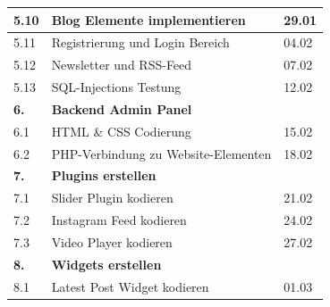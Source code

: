 \begin{table}[h]
\begin{center}
\begin{tabular}{ |l|l|l| }
\hline
5.10 & Blog Elemente implementieren & 29.01 \\
\hline
5.11 & Registrierung und Login Bereich & 04.02 \\
\hline
5.12 & Newsletter und RSS-Feed & 07.02 \\
\hline
5.13 & SQL-Injections Testung & 12.02 \\
\hline
 \textbf{6.} & \textbf{Backend Admin Panel} &  \\ 
 \hline
 6.1 & HTML \& CSS Codierung & 15.02 \\
 \hline
 6.2 & PHP-Verbindung zu Website-Elementen & 18.02 \\
 \hline
 \textbf{7.} & \textbf{Plugins erstellen} &  \\ 
 \hline
 7.1 & Slider Plugin kodieren & 21.02 \\
 \hline
 7.2 & Instagram Feed kodieren & 24.02 \\
 \hline
  7.3 & Video Player kodieren & 27.02 \\
 \hline
\textbf{8.} & \textbf{Widgets erstellen} &  \\ 
 \hline
 8.1 & Latest Post Widget kodieren & 01.03 \\
 \hline
 \end{tabular}
 \end{center}
 \end{table}
 \newpage
